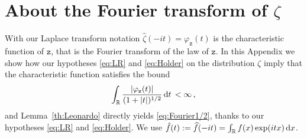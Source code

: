 \documentclass[reqno,11pt]{amsart}
\numberwithin{equation}{section}
\newcommand{\dd}{\,\text{\rm d}}             %
\newcommand{\bbC}{{\ensuremath{\mathbb C}} }
\newcommand{\bbR}{{\ensuremath{\mathbb R}} }
\newcommand{\gp}{\varphi}
\newcommand{\gG}{\Gamma}
\newcommand{\logZ}{\mathtt{z}}
\begin{document}

\section{About the Fourier transform of $\zeta$}
With our Laplace transform notation 
$\widehat \zeta (-it)=\gp_\logZ(t)$ is the characteristic function of $\logZ$, that is the Fourier transform of the law of  $\logZ$.
In this Appendix we show how our hypotheses
\eqref{eq:LR} and \eqref{eq:Holder} on the distribution $\zeta$ imply that the characteristic function satisfies the bound
\begin{equation}
\label{eq:Fourier1/2}
\int_\bbR \frac{\vert \gp_\logZ (t)\vert}{(1+\vert t \vert)^{1/2}} \dd t \, < \infty\, ,
\end{equation} 
and Lemma~\ref{th:Leonardo} directly yields \eqref{eq:Fourier1/2}, thanks to our hypotheses
\eqref{eq:LR} and \eqref{eq:Holder}. 
We use $\hat f(t):= \widehat f (-it)= \int_\bbR f(x) \exp(it x) \dd x$.
\end{document}
